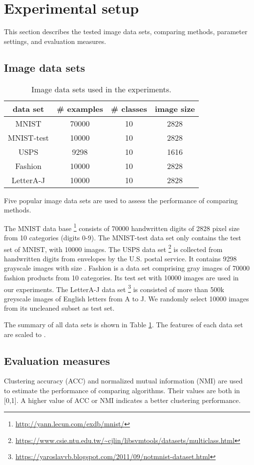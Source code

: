\documentclass[10pt,twocolumn,letterpaper]{article}
\begin{document}
\section{Experimental setup}\label{sec:exp_set}
This section describes the tested image data sets, comparing methods, parameter settings, and evaluation measures.

\subsection{Image data sets}
\begin{table}[!h]
\caption{Image data sets used in the experiments.}
\centering \begin{tabular}{cccc}
\hline
data set & \# examples & \# classes & image size\\
\hline
MNIST & 70000 & 10 & 2828 \\
MNIST-test & 10000 & 10 & 2828 \\
USPS & 9298 &10 & 1616  \\
Fashion & 10000  & 10  & 2828 \\
LetterA-J  & 10000  & 10  & 2828 \\
\hline
\end{tabular}
\label{tab:data}
\end{table}
Five popular image data sets are used to assess the performance of comparing methods.

The MNIST data base \footnote{\url{http://yann.lecun.com/exdb/mnist/}} consists of 70000 handwritten digits of 2828 pixel size from 10 categories (digits 0-9). 
The MNIST-test data set only contains the test set of MNIST, with 10000 images.
The USPS data set \footnote{\url{https://www.csie.ntu.edu.tw/~cjlin/libsvmtools/datasets/multiclass.html}} is collected from handwritten digits from envelopes by the U.S. postal service. It contains 9298 grayscale images with size . 
Fashion \cite{Xiao2017Fashion} is a data set comprising  gray images of 70000 fashion products from 10 categories. Its test set with 10000 images are used in our experiments.
The LetterA-J data set \footnote{\url{https://yaroslavvb.blogspot.com/2011/09/notmnist-dataset.html}} is consisted of more than 500k  greyscale images of English letters from A to J. We randomly select 10000 images from its uncleaned subset as test set.

The summary of all data sets is shown in Table \ref{tab:data}. The features of each data set are scaled to . 



\subsection{Evaluation measures}\label{sec:metric}
Clustering accuracy (ACC) and normalized mutual information (NMI) are used to estimate the performance of comparing algorithms. Their values are both in [0,1]. A higher value of ACC or NMI indicates a better clustering performance.
\end{document}
